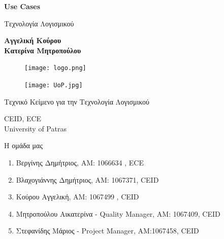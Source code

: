 \documentclass{article}
\begin{document}

\begin{titlepage}
   \begin{center}
       \vspace*{1cm}

       \textbf{\huge Use Cases}

       \vspace{0.5cm}
        Τεχνολογία Λογισμικού
            
       \vspace{1cm}

       \textbf{Αγγελική Κούρου\\Κατερίνα Μητροπούλου}
       
       \begin{figure}[!htb]
        \centering
        \texttt{[image: logo.png]}
        \end{figure}
        
        \vspace{0.5cm}
        
        \begin{figure}[!htb]
        \centering
        \texttt{[image: UoP.jpg]}
        \end{figure}


       \vfill
            
       Τεχνικό Κείμενο για την Τεχνολογία Λογισμικού\\
            
       \vspace{0.5cm}
            
       CEID, ECE\\
       University of Patras\\
            
   \end{center}
\end{titlepage}



\noindent Η ομάδα μας

\begin{enumerate}
  \item Βεργίνης Δημήτριος, ΑΜ: 1066634 , ECE
  \item Βλαχογιάννης Δημήτριος, ΑΜ: 1067371, CEID
  \item Κούρου Αγγελική, ΑΜ: 1067499 , CEID
  \item Μητροπούλου Αικατερίνα - Quality Manager, ΑΜ: 1067409, CEID
  \item Στεφανίδης Μάριος - Project Manager, ΑΜ:1067458, CEID
\end{enumerate}
\end{document}
